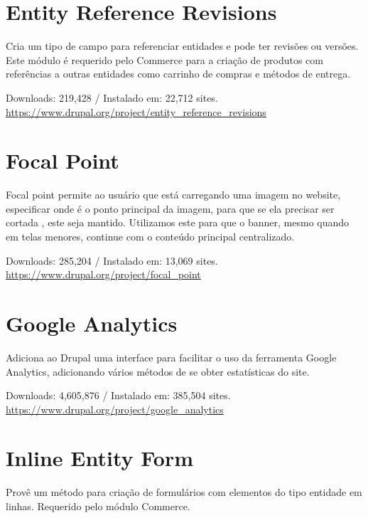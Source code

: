 \section{Entity Reference Revisions}
Cria um tipo de campo para referenciar entidades e pode ter revisões ou versões. Este módulo é requerido pelo Commerce para a criação de produtos com referências a outras entidades como carrinho de compras e métodos de entrega.

\begin{center}
  Downloads: 219,428 / Instalado em: 22,712 sites. \\
  \url{https://www.drupal.org/project/entity_reference_revisions}
\end{center}

\section{Focal Point}
Focal point permite ao usuário que está carregando uma imagem no website, especificar onde é o ponto principal da imagem, para que se ela precisar ser cortada , este seja mantido. Utilizamos este para que o banner, mesmo quando em telas menores, continue com o conteúdo principal centralizado.

\begin{center}
  Downloads: 285,204 / Instalado em: 13,069 sites. \\
  \url{https://www.drupal.org/project/focal_point}
\end{center}

\section{Google Analytics}
Adiciona ao Drupal uma interface para facilitar o uso da ferramenta Google Analytics, adicionando vários métodos de se obter estatísticas do site.

\begin{center}
  Downloads: 4,605,876 / Instalado em: 385,504 sites. \\
  \url{https://www.drupal.org/project/google_analytics}
\end{center}

\section{Inline Entity Form}
Provê um método para criação de formulários com elementos do tipo entidade em linhas. Requerido pelo módulo Commerce.

